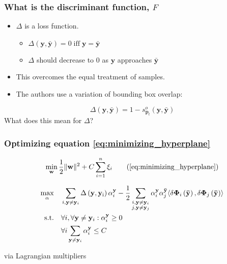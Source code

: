 \begin{frame}
    \frametitle{What is the discriminant function, \(F\)}
    \begin{itemize}
        \item \(\Delta\) is a loss function.
            \begin{itemize}
                \item \(\Delta (\mathbf{y}, \mathbf{\bar{y}}) = 0 \; \text{iff} \; \mathbf{y} = \mathbf{\bar{y}}\)
                \item \(\Delta\) should decrease to 0 as \(\mathbf{y}\) approaches \(\mathbf{\bar{y}}\)
            \end{itemize}
        \item This overcomes the equal treatment of samples.
        \item The authors use a variation of bounding box overlap:
    \end{itemize}
    \begin{equation}
        \Delta(\mathbf{y}, \mathbf{\bar{y}}) = 1 - s_{\mathbf{p}_t}^o (\mathbf{y}, \mathbf{\bar{y}})
    \end{equation}
    \alert{What does this mean for \(\Delta\)?}
\end{frame}

\begin{frame}
    \frametitle{Optimizing equation \eqref{eq:minimizing_hyperplane}}
    \begin{equation}
        \min_{\mathbf{w}} \frac{1}{2} \|\mathbf{w}\|^2 + C \sum_{i=1}^n \xi_i \tag{\ref{eq:minimizing_hyperplane}}
    \end{equation}

    \begin{equation}
        \begin{aligned}
            \max_{\alpha} \quad & \sum_{i, \mathbf{y} \ne \mathbf{y}_i} \operatorname{\Delta \left( \mathbf{y}, \mathbf{y}_i \right)} \alpha_i^\mathbf{y} -
                \frac{1}{2} \sum_{\substack{i, \mathbf{y} \ne \mathbf{y}_i \\ j, \mathbf{y} \ne \mathbf{y}_j}}
                \alpha_i^\mathbf{y} \alpha_j^\mathbf{\bar{y}} \langle \delta \mathbf{\Phi}_i \left( \mathbf{\bar{y}} \right),
                \delta \mathbf{\Phi}_j \left( \mathbf{\bar{y}} \right) \rangle \\
            \operatorname{\text{s.t.} \quad} & \forall i, \forall \mathbf{y} \ne \mathbf{y}_i : \alpha_i^\mathbf{y} \ge 0 \\
                & \forall i \sum_{\mathbf{y} \ne \mathbf{y}_i} \alpha_i^\mathbf{y} \le C
        \end{aligned}
    \end{equation}

    via Lagrangian multipliers
\end{frame}

